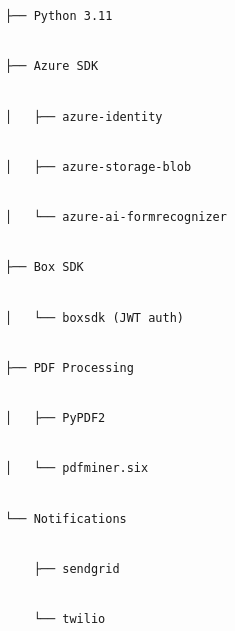 \documentclass[
]{article}
\begin{document}
\texttt{├──\ Python\ 3.11}\strut \\
\texttt{├──\ Azure\ }\texttt{SDK}\strut \\
\texttt{│\ \ \ ├──\ azure-identity}\strut \\
\texttt{│\ \ \ ├──\ azure-storage-blob}\strut \\
\texttt{│\ \ \ └──\ azure-ai-formrecognizer}\strut \\
\texttt{├──\ Box\ SDK}\strut \\
\texttt{│\ \ \ └──\ boxsdk\ (JWT\ auth)}\strut \\
\texttt{├──\ PDF\ Processing}\strut \\
\texttt{│\ \ \ ├──\ PyPDF2}\strut \\
\texttt{│\ \ \ └──\ pdfminer.six}\strut \\
\texttt{└──\ Notifications}\strut \\
\texttt{\ \ \ \ ├──\ sendgrid}\strut \\
\texttt{\ \ \ \ └──\ twilio}
\end{document}
